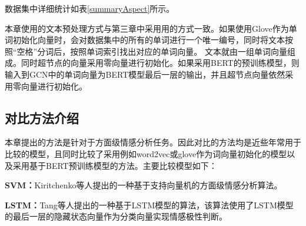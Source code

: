 数据集中详细统计如表\ref{summaryAspect}所示。
\begin{table}[htb]
	\centering
	\caption{数据集数据统计}
\end{table}

本章使用的文本预处理方式与第三章中采用用的方式一致。如果使用Glove作为单词初始化向量时，会对数据集中的所有的单词进行一个唯一编号，同时将文本按照“空格”分词后，按照单词索引找出对应的单词向量。
文本就由一组单词向量组成。同时超节点的向量采用零向量进行初始化。如果采用BERT的预训练模型，则输入到GCN中的单词向量为BERT模型最后一层的输出，并且超节点向量依然采用零向量进行初始化。

\subsection{对比方法介绍}
本章提出的方法是针对于方面级情感分析任务。因此对比的方法均是近些年常用于比较的模型，且同时比较了采用例如word2vec或glove作为词向量初始化的模型以及采用基于BERT预训练模型的方法。主要比较模型如下：

\textbf{SVM：}Kiritchenko等人提出的一种基于支持向量机的方面级情感分析算法。

\textbf{LSTM：}Tang等人提出的一种基于LSTM模型的算法，该算法使用了LSTM模型的最后一层的隐藏状态向量作为分类向量实现情感极性判断。

